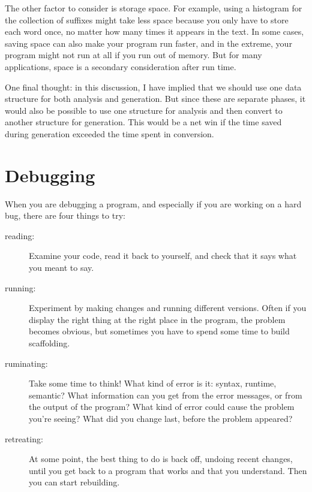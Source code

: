 \documentclass[10pt]{book}
\begin{document}

The other factor to consider is storage space.  For example, using a
histogram for the collection of suffixes might take less space because
you only have to store each word once, no matter how many times it
appears in the text.  In some cases, saving space can also make your
program run faster, and in the extreme, your program might not run at
all if you run out of memory.  But for many applications, space is a
secondary consideration after run time.

One final thought: in this discussion, I have implied that
we should use one data structure for both analysis and generation.  But
since these are separate phases, it would also be possible to use one
structure for analysis and then convert to another structure for
generation.  This would be a net win if the time saved during
generation exceeded the time spent in conversion.


\section{Debugging}

When you are debugging a program, and especially if you are
working on a hard bug, there are four things to try:

\begin{description}

\item[reading:] Examine your code, read it back to yourself, and
check that it says what you meant to say.

\item[running:] Experiment by making changes and running different
versions.  Often if you display the right thing at the right place
in the program, the problem becomes obvious, but sometimes you have to
spend some time to build scaffolding.

\item[ruminating:] Take some time to think!  What kind of error
is it: syntax, runtime, semantic?  What information can you get from
the error messages, or from the output of the program?  What kind of
error could cause the problem you're seeing?  What did you change
last, before the problem appeared?

\item[retreating:] At some point, the best thing to do is back
off, undoing recent changes, until you get back to a program that
works and that you understand.  Then you can start rebuilding.

\end{description}
\end{document}
